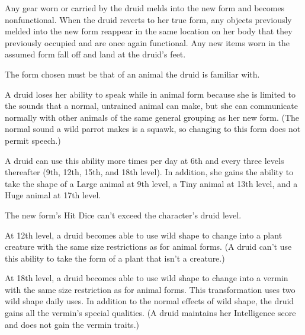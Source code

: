 Any gear worn or carried by the druid melds into the new form and becomes nonfunctional. When the druid reverts to her true form, any objects previously melded into the new form reappear in the same location on her body that they previously occupied and are once again functional. Any new items worn in the assumed form fall off and land at the druid's feet.

The form chosen must be that of an animal the druid is familiar with.

A druid loses her ability to speak while in animal form because she is limited to the sounds that a normal, untrained animal can make, but she can communicate normally with other animals of the same general grouping as her new form. (The normal sound a wild parrot makes is a squawk, so changing to this form does not permit speech.)

A druid can use this ability more times per day at 6th and every three levels thereafter (9th, 12th, 15th, and 18th level). In addition, she gains the ability to take the shape of a Large animal at 9th level, a Tiny animal at 13th level, and a Huge animal at 17th level.

The new form's Hit Dice can't exceed the character's druid level.

At 12th level, a druid becomes able to use wild shape to change into a plant creature with the same size restrictions as for animal forms. (A druid can't use this ability to take the form of a plant that isn't a creature.)

At 18th level, a druid becomes able to use wild shape to change into a vermin with the same size restriction as for animal forms. This transformation uses two wild shape daily uses. In addition to the normal effects of wild shape, the druid gains all the vermin's special qualities. (A druid maintains her Intelligence score and does not gain the vermin traits.)



